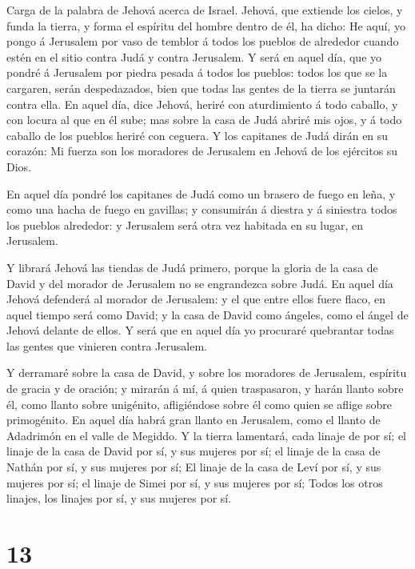  Carga de la palabra de Jehová acerca de Israel. Jehová, que
extiende los cielos, y funda la tierra, y forma el espíritu del hombre
dentro de él, ha dicho:  He aquí, yo pongo á Jerusalem por
vaso de temblor á todos los pueblos de alrededor cuando estén en el
sitio contra Judá y contra Jerusalem.  Y será en aquel día,
que yo pondré á Jerusalem por piedra pesada á todos los pueblos: todos
los que se la cargaren, serán despedazados, bien que todas las gentes de
la tierra se juntarán contra ella.  En aquel día, dice
Jehová, heriré con aturdimiento á todo caballo, y con locura al que en
él sube; mas sobre la casa de Judá abriré mis ojos, y á todo caballo de
los pueblos heriré con ceguera.  Y los capitanes de Judá
dirán en su corazón: Mi fuerza son los moradores de Jerusalem en Jehová
de los ejércitos su Dios.

 En aquel día pondré los capitanes de Judá como un brasero
de fuego en leña, y como una hacha de fuego en gavillas; y consumirán á
diestra y á siniestra todos los pueblos alrededor: y Jerusalem será otra
vez habitada en su lugar, en Jerusalem.

 Y librará Jehová las tiendas de Judá primero, porque la
gloria de la casa de David y del morador de Jerusalem no se engrandezca
sobre Judá.  En aquel día Jehová defenderá al morador de
Jerusalem: y el que entre ellos fuere flaco, en aquel tiempo será como
David; y la casa de David como ángeles, como el ángel de Jehová delante
de ellos.  Y será que en aquel día yo procuraré quebrantar
todas las gentes que vinieren contra Jerusalem.

 Y derramaré sobre la casa de David, y sobre los moradores
de Jerusalem, espíritu de gracia y de oración; y mirarán á mí, á quien
traspasaron, y harán llanto sobre él, como llanto sobre unigénito,
afligiéndose sobre él como quien se aflige sobre primogénito.
 En aquel día habrá gran llanto en Jerusalem, como el
llanto de Adadrimón en el valle de Megiddo.  Y la tierra
lamentará, cada linaje de por sí; el linaje de la casa de David por sí,
y sus mujeres por sí; el linaje de la casa de Nathán por sí, y sus
mujeres por sí;  El linaje de la casa de Leví por sí, y sus
mujeres por sí; el linaje de Simei por sí, y sus mujeres por sí;
 Todos los otros linajes, los linajes por sí, y sus mujeres
por sí.

\hypertarget{section-12}{%
\section{13}\label{section-12}}

